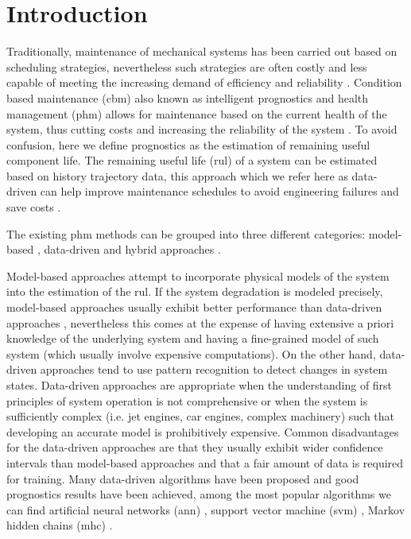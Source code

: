 \section{Introduction}
\label{sec:rul_intro}

Traditionally, maintenance of mechanical systems has been carried out based on scheduling strategies, nevertheless such strategies are often costly and less capable of meeting the increasing demand of efficiency and reliability \cite{Gebraeel2005, Zaidan2013}. Condition based maintenance (\gls{cbm}) also known as intelligent prognostics and health management (\gls{phm}) allows for maintenance based on the current health of the system, thus cutting costs and increasing the reliability of the system \cite{Zhao2017}. To avoid confusion, here we define prognostics as the estimation of remaining useful component life. The remaining useful life (\gls{rul}) of a system can be estimated based on history trajectory data, this approach which we refer here as data-driven can help improve maintenance schedules to avoid engineering failures and save costs \cite{Lee2014}.

The existing \gls{phm} methods can be grouped into three different categories: model-based \cite{Yu2001} , data-driven \cite{Liu2009, Mosallam2013} and hybrid approaches \cite{Pecht2010, Liu2012}.

Model-based approaches attempt to incorporate physical models of the system into the estimation of the \gls{rul}. If the system degradation is modeled  precisely, model-based approaches usually exhibit better performance than data-driven approaches \cite{Qian2017}, nevertheless this comes at the expense of having extensive a priori knowledge of the underlying system and having a fine-grained model of such system (which usually involve expensive computations). On the other hand, data-driven approaches tend to use pattern recognition to detect changes in system states. Data-driven approaches are appropriate when the understanding of first principles of system operation is not comprehensive or when the system is sufficiently complex (i.e. jet engines, car engines, complex machinery) such that developing an accurate model is prohibitively expensive. Common disadvantages for the data-driven approaches are that they usually exhibit wider confidence intervals than model-based approaches and that a fair amount of data is required for training. Many data-driven algorithms have been proposed and good prognostics results have been achieved, among the most popular algorithms we can find artificial neural networks (\gls{ann}) \cite{Gebraeel2004}, support vector machine (\gls{svm}) \cite{Benkedjouh2013}, Markov hidden chains (\gls{mhc}) \cite{Dong2007}.

